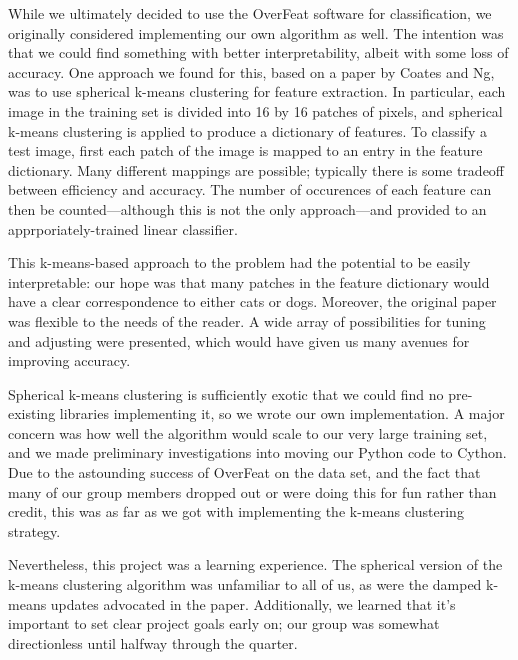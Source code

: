 
While we ultimately decided to use the OverFeat software for classification,
we originally considered implementing our own algorithm as well.
The intention was that we could find something with better interpretability,
albeit with some loss of accuracy.
One approach we found for this, based on a paper by Coates and Ng,
was to use spherical k-means clustering for feature extraction.
In particular, each image in the training set is divided into 16 by 16 patches
of pixels, and spherical k-means clustering is applied to produce a dictionary of features.
To classify a test image, 
first each patch of the image is mapped to an entry in the feature dictionary.
Many different mappings are possible;
typically there is some tradeoff between efficiency and accuracy.
The number of occurences of each feature can then be counted---although this
is not the only approach---and provided to an apprporiately-trained linear
classifier.

This k-means-based approach to the problem had the potential to be easily
interpretable: our hope was that many patches in the feature dictionary would
have a clear correspondence to either cats or dogs.
Moreover, the original paper was flexible to the needs of the reader.
A wide array of possibilities for tuning and adjusting were presented,
which would have given us many avenues for improving accuracy.

Spherical k-means clustering is sufficiently exotic that we could find no
pre-existing libraries implementing it, so we wrote our own implementation.
A major concern was how well the algorithm would scale to our very large
training set, and we made preliminary investigations into moving our
Python code to Cython.
Due to the astounding success of OverFeat on the data set, and the fact that
many of our group members dropped out or were doing this for fun rather than
credit, this was as far as we got with implementing the k-means clustering
strategy.

Nevertheless, this project was a learning experience.
The spherical version of the k-means clustering algorithm was unfamiliar to
all of us, as were the damped k-means updates advocated in the paper.
Additionally, we learned that it's important to set clear project goals early
on; our group was somewhat directionless until halfway through the quarter.




